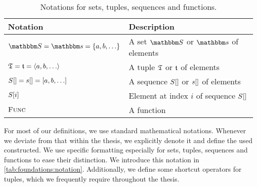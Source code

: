 \begin{table}
    \centering
    \small
    \renewcommand{\arraystretch}{1.4}%
    \begin{tabular}{L{10em} L{17em}}
        \toprule
        \textbf{Notation} & \textbf{Description} \\
        \midrule
        $\set{S} = \set{s} = \setted{a, b, \ldots}$ 
            & A set $\set{S}$ or $\set{s}$ of elements\\
        $\mathfrak{T} = \mathfrak{t} = \langle a, b, \ldots \rangle$ 
            & A tuple $\mathfrak{T}$ or $\mathfrak{t}$ of elements\\
        $S[] = s[] = [a, b, \ldots]$ 
            & A sequence $S[]$ or $s[]$ of elements\\
        $S[i]$ 
            & Element at index $i$ of sequence $S[]$\\
        $\textsc{Func}$ 
            & A function\\
        \bottomrule
    \end{tabular}
    \caption[Notations for sets, tuples, sequences and functions]{Notations for sets, tuples, sequences and functions.}
    \label{tab:foundations:notation}
\end{table}

For most of our definitions, we use standard mathematical notations.
Whenever we deviate from that within the thesis, we explicitly denote it and define the used constructed.
We use specific formatting especially for sets, tuples, sequences and functions to ease their distinction.
We introduce this notation in \autoref{tab:foundations:notation}.
Additionally, we define some shortcut operators for tuples, which we frequently require throughout the thesis.

